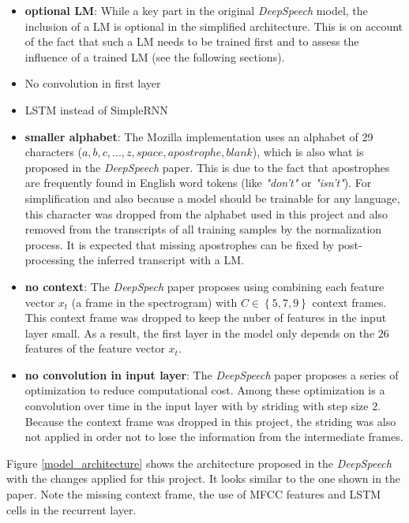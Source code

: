 \begin{itemize}
	\item \textbf{optional \ac{LM}}: While a key part in the original \textit{DeepSpeech} model, the inclusion of a  \ac{LM} is optional in the simplified architecture. This is on account of the fact that such a \ac{LM} needs to be trained first and to assess the influence of a trained \ac{LM} (see the following sections).
	\item No convolution in first layer
	\item LSTM instead of SimpleRNN
	\item \textbf{smaller alphabet}: The Mozilla implementation uses an alphabet of 29 characters (${a,b,c,...,z, space, apostrophe, blank}$), which is also what is proposed in the \textit{DeepSpeech} paper. This is due to the fact that apostrophes are frequently found in English word tokens (like \textit{"don't"} or \textit{"isn't"}). For simplification and also because a model should be trainable for any language, this character was dropped from the alphabet used in this project and also removed from the transcripts of all training samples by the normalization process. It is expected that missing apostrophes can be fixed by post-processing the inferred transcript with a \ac{LM}.
	\item \textbf{no context}: The \textit{DeepSpech} paper proposes using combining each feature vector $x_t$ (a frame in the spectrogram) with $C \in \left\{ 5,7,9 \right\}$ context frames. This context frame was dropped to keep the nuber of features in the input layer small. As a result, the first layer in the model only depends on the $26$ features of the feature vector $x_t$.
	\item \textbf{no convolution in input layer}: The \textit{DeepSpeech} paper proposes a series of optimization to reduce computational cost. Among these optimization is a convolution over time in the input layer with by striding with step size $2$. Because the context frame was dropped in this project, the striding was also not applied in order not to lose the information from the intermediate frames.
\end{itemize}


Figure \ref{model_architecture} shows the architecture proposed in the \textit{DeepSpeech} with the changes applied for this project. It looks similar to the one shown in the paper. Note the missing context frame, the use of \ac{MFCC} features and \ac{LSTM} cells in the recurrent layer.

